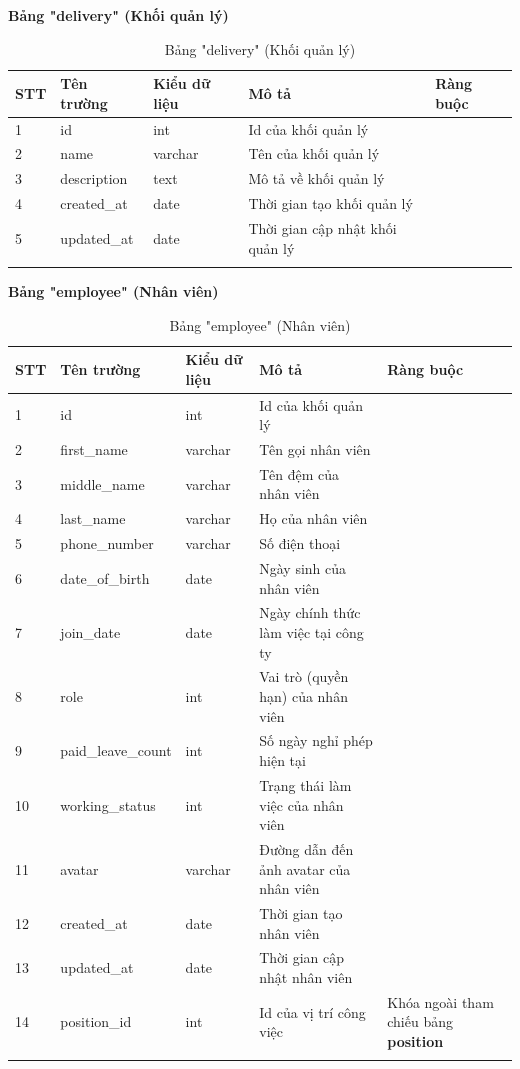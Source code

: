 \documentclass[../DoAn.tex]{subfiles}
\begin{document}
\textbf{Bảng "delivery" (Khối quản lý)}
\begin{longtable}{|p{}|p{}|p{}|p{}|p{}|}
\hline
\textbf{STT} & \textbf{Tên trường} & \textbf{Kiểu dữ liệu} & \textbf{Mô tả } & \textbf{Ràng buộc} \\ \hline
1   & id & int & Id của khối quản lý & \\ \hline
2   & name & varchar & Tên của khối quản lý & \\ \hline
3   & description & text & Mô tả về khối quản lý & \\ \hline
4   & created\_at & date & Thời gian tạo khối quản lý & \\ \hline
5   & updated\_at & date & Thời gian cập nhật khối quản lý & \\ \hline
\caption{Bảng "delivery" (Khối quản lý)}
\end{longtable}

\textbf{Bảng "employee" (Nhân viên)}
\begin{longtable}{|p{}|p{}|p{}|p{}|p{}|}
\hline
\textbf{STT} & \textbf{Tên trường} & \textbf{Kiểu dữ liệu} & \textbf{Mô tả } & \textbf{Ràng buộc} \\ \hline
1   & id & int & Id của khối quản lý & \\ \hline
2   & first\_name & varchar & Tên gọi nhân viên & \\ \hline
3   & middle\_name & varchar & Tên đệm của nhân viên & \\ \hline
4   & last\_name & varchar & Họ của nhân viên & \\ \hline
5   & phone\_number & varchar & Số điện thoại & \\ \hline
6   & date\_of\_birth & date & Ngày sinh của nhân viên & \\ \hline
7   & join\_date & date & Ngày chính thức làm việc tại công ty & \\ \hline
8   & role & int & Vai trò (quyền hạn) của nhân viên & \\ \hline
9   & paid\_leave\_count & int & Số ngày nghỉ phép hiện tại & \\ \hline
10   & working\_status & int & Trạng thái làm việc của nhân viên & \\ \hline
11   & avatar & varchar & Đường dẫn đến ảnh avatar của nhân viên & \\ \hline
12   & created\_at & date & Thời gian tạo nhân viên & \\ \hline
13   & updated\_at & date & Thời gian cập nhật nhân viên & \\ \hline
14   & position\_id & int & Id của vị trí công việc & Khóa ngoài tham chiếu bảng 
\textbf{position}\\ \hline
\caption{Bảng "employee" (Nhân viên)}
\end{longtable}
\end{document}

